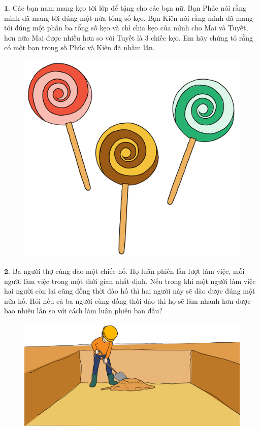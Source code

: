 \begin{multicols}{2}
	$\pmb{1.}$ Các bạn nam mang kẹo tới lớp để tặng cho các bạn nữ. Bạn Phúc nói rằng mình đã mang tới đúng một nửa tổng số kẹo. Bạn Kiên nói rằng mình đã mang tới đúng một phần ba tổng số kẹo và chỉ chia kẹo của mình cho Mai và Tuyết, hơn nữa Mai được nhiều hơn so với Tuyết là $3$ chiếc kẹo. Em hãy chứng tỏ rằng có một bạn trong số Phúc và Kiên đã nhầm lẫn.
	\begin{figure}[H]
		\centering
		\vspace*{-5pt}
		\captionsetup{labelformat= empty, justification=centering}
		\includegraphics[width=0.72\linewidth]{Pi7_bai1}
		\vspace*{-10pt}
	\end{figure}
	$\pmb{2.}$ Ba người thợ cùng đào một chiếc hố. Họ luân phiên lần lượt làm việc, mỗi người làm việc trong một thời gian nhất định. Nếu trong khi một người làm việc hai người còn lại cũng đồng thời đào hố thì hai người này sẽ đào được đúng một nửa hố. Hỏi nếu cả ba người cùng đồng thời đào thì họ sẽ làm nhanh hơn được bao nhiêu lần so với cách làm luân phiên ban đầu?
	\begin{figure}[H]
		\centering
		\vspace*{-5pt}
		\captionsetup{labelformat= empty, justification=centering}
		\includegraphics[width=1\linewidth]{Pi7_bai2}

\end{figure}
\end{multicols}
